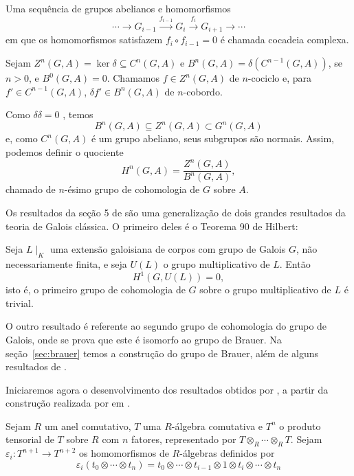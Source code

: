 Uma sequência de grupos abelianos e homomorfismos \[\cdots \rightarrow G_{i-1} \xrightarrow{f_{i-1}} G_{i} \xrightarrow{f_i} G_{i+1} \rightarrow \cdots\] em que os homomorfismos satisfazem $f_i \circ f_{i-1}=0$ é chamada cocadeia complexa.\par 
Sejam $Z^n(G,A)=\ker{\delta} \subseteq C^n(G,A)$ e $B^n(G,A)=\delta(C^{n-1}(G,A))$, se $n>0$, e $B^0(G,A)=0$. Chamamos $f\in Z^n(G,A)$ de $n$-cociclo e, para $f' \in C^{n-1}(G,A)$, $\delta f' \in B^n(G,A)$ de $n$-cobordo. \par 
Como $\delta\delta = 0$ , temos 
\[B^n(G,A) \subseteq Z^n(G,A) \subset G^n(G,A)\]
e, como $C^n(G,A)$ é um grupo abeliano, seus subgrupos são normais. Assim, podemos definir o quociente \[H^n(G,A) = \dfrac{Z^n(G,A)}{B^n(G,A)},\] chamado de $n$-ésimo grupo de cohomologia de $G$ sobre $A$. \par
Os resultados da seção 5 de \cite{chr} são uma generalização de dois grandes resultados da teoria de Galois clássica. O primeiro deles é o Teorema 90 de Hilbert:
\begin{teo*}
Seja $L\mid_K$ uma extensão galoisiana de corpos com grupo de Galois $G$, não necessariamente finita, e seja $U(L)$ o grupo multiplicativo de $L$. Então \[H^1\left(G,U(L)\right)=0,\] isto é, o primeiro grupo de cohomologia de $G$ sobre o grupo multiplicativo de $L$ é trivial.
\end{teo*}
O outro resultado é referente ao segundo grupo de cohomologia do grupo de Galois, onde se prova que este é isomorfo ao grupo de Brauer. Na seção~\ref{sec:brauer} temos a construção do grupo de Brauer, além de alguns resultados de \citeauthor{brauer} \cite{brauer}. \par 
Iniciaremos agora o desenvolvimento dos resultados obtidos por \citeauthor*{chr}, a partir da construção realizada por \citeauthor{amitsur2} em \cite{amitsur2}. \par
Sejam $R$ um anel comutativo, $T$ uma $R$-álgebra comutativa e $T^n$ o produto tensorial de $T$ sobre $R$ com $n$ fatores, representado por $T\otimes_R \cdots \otimes_R T$. Sejam $\varepsilon_i: T^{n+1} \rightarrow T^{n+2}$ os homomorfismos de $R$-álgebras definidos por
\[\varepsilon_i(t_0\otimes\cdots\otimes t_n) = t_0 \otimes \cdots \otimes t_{i-1}\otimes 1 \otimes t_i \otimes \cdots \otimes t_n\]
